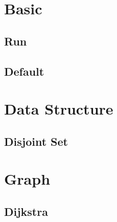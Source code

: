 \section{Basic}
    \subsection{Run}
        
    \subsection{Default}
        
    
\section{Data Structure}
    \subsection{Disjoint Set}
        

\section{Graph}
    \subsection{Dijkstra}
        